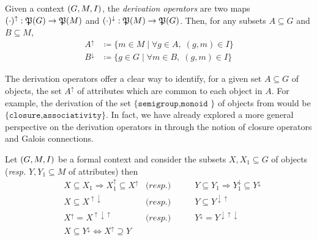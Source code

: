 \begin{definition}
  \label{definition:derivation-operators}  Given a context $(G,M,\mathrel{I})$, the \textit{derivation operators} are two maps $(\cdot)^{\uparrow}: \mathfrak{P}({G})\to \mathfrak{P}({M})$
  and $(\cdot )^{\downarrow}: \mathfrak{P}({M})\to \mathfrak{P}({G})$. Then, for any subsets $A \subseteq G$ and $B \subseteq M$,
  \begin{align*}
    A^{\uparrow}   & \coloneqq \{m \in M \mid \forall g \in A, \; (g,m) \in I\} \\
    B^{\downarrow} & \coloneqq \{g \in G \mid \forall m \in B, \; (g,m) \in I\}
  \end{align*}
\end{definition}

The derivation operators offer a clear way to identify, for a given set $A \subseteq G$ of objects, the set $A^{\uparrow}$ of attributes which are common to each object in $A$. For
example, the derivation of the set $\{\texttt{semigroup,monoid }\}$ of objects from  would be $\{\texttt{closure,associativity}\}$. In
fact, we have already explored a more general perspective on the derivation operators in  through the notion of closure operators and Galois connections.

\begin{proposition}
  \label{proposition:derivation-operators-galois} Let $(G,M,\mathrel{I})$ be a formal context and consider the subsets $X,X_{1}\subseteq G$ of objects (\textit{resp.} $Y,Y_{1}\subseteq M$ of attributes)
  then
  \begin{align}
     & X \subseteq X_{1}\Rightarrow X_{1}^{\uparrow}\subseteq X^{\uparrow}   & \textit{(resp.)}         & \qquad Y \subseteq Y_{1}\Rightarrow Y_{1}^{\downarrow}\subseteq Y^{\downarrow}\label{equation:galois-1} \\
     & X \subseteq X^{\uparrow \downarrow}                                   & \textit{(resp.)}         & \qquad Y \subseteq Y^{\downarrow \uparrow}\label{equation:galois-2}                                     \\
     & X^{\uparrow}= X^{\uparrow \downarrow \uparrow}                        & \textit{(resp.)}         & \qquad Y^{\downarrow}= Y^{\downarrow \uparrow \downarrow}\label{equation:galois-3}                      \\
     & X \subseteq Y^{\downarrow}\Longleftrightarrow X^{\uparrow}\supseteq Y & \label{equation:galois-4}
  \end{align}
\end{proposition}

